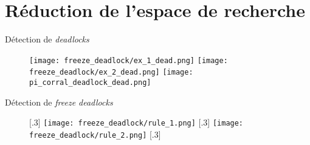     \section{Réduction de l'espace de recherche}
        \begin{frame}{Détection de \textit{deadlocks}}
            \begin{figure}
                \centering
                    {\texttt{[image: freeze\_deadlock/ex\_1\_dead.png]}}
                    {\texttt{[image: freeze\_deadlock/ex\_2\_dead.png]}}
                    {\texttt{[image: pi\_corral\_deadlock\_dead.png]}}
            \end{figure}
        \end{frame}

        \begin{frame}{Détection de \textit{freeze deadlocks}}
            \begin{figure}
                \centering
                [.3\textwidth]
                {\texttt{[image: freeze\_deadlock/rule\_1.png]}}
                [.3\textwidth]
                {\texttt{[image: freeze\_deadlock/rule\_2.png]}}
                [.3\textwidth] {
                }
            \end{figure}
        \end{frame}

